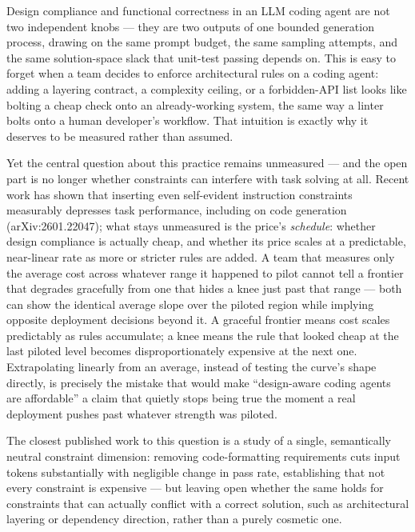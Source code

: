\documentclass[11pt]{article}
\begin{document}
Design compliance and functional correctness in an LLM coding agent are not two independent knobs --- they are two outputs of one bounded generation process, drawing on the same prompt budget, the same sampling attempts, and the same solution-space slack that unit-test passing depends on. This is easy to forget when a team decides to enforce architectural rules on a coding agent: adding a layering contract, a complexity ceiling, or a forbidden-API list looks like bolting a cheap check onto an already-working system, the same way a linter bolts onto a human developer's workflow. That intuition is exactly why it deserves to be measured rather than assumed.

Yet the central question about this practice remains unmeasured --- and the open part is no longer whether constraints can interfere with task solving at all. Recent work has shown that inserting even self-evident instruction constraints measurably depresses task performance, including on code generation (arXiv:2601.22047); what stays unmeasured is the price's \textit{schedule}: whether design compliance is actually cheap, and whether its price scales at a predictable, near-linear rate as more or stricter rules are added. A team that measures only the average cost across whatever range it happened to pilot cannot tell a frontier that degrades gracefully from one that hides a knee just past that range --- both can show the identical average slope over the piloted region while implying opposite deployment decisions beyond it. A graceful frontier means cost scales predictably as rules accumulate; a knee means the rule that looked cheap at the last piloted level becomes disproportionately expensive at the next one. Extrapolating linearly from an average, instead of testing the curve's shape directly, is precisely the mistake that would make ``design-aware coding agents are affordable'' a claim that quietly stops being true the moment a real deployment pushes past whatever strength was piloted.

The closest published work to this question is a study of a single, semantically neutral constraint dimension: removing code-formatting requirements cuts input tokens substantially with negligible change in pass rate, establishing that not every constraint is expensive --- but leaving open whether the same holds for constraints that can actually conflict with a correct solution, such as architectural layering or dependency direction, rather than a purely cosmetic one.
\end{document}
